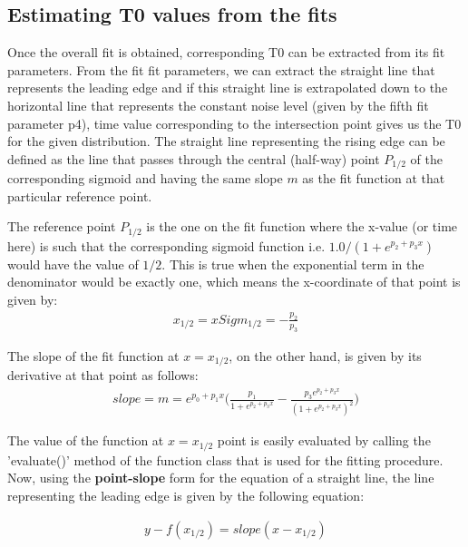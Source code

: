 \documentclass[12pt,epsfig]{article}
\begin{document}
\subsection{Estimating T0 values from the fits}

Once the overall fit is obtained, corresponding T0 can be extracted from its fit parameters. From the fit
fit parameters, we can extract the straight line that represents the leading edge and if this straight line
is extrapolated down to the horizontal line that represents the constant noise level (given by the fifth
fit parameter p4), time value corresponding to the intersection point gives us the T0 for the given
distribution. The straight line representing the rising edge can be defined as the line that passes through the
central (half-way) point $P_{1/2}$ of the corresponding sigmoid and having the same slope $m$ as the
fit function at that particular reference point.

The reference point $P_{1/2}$ is the one on the fit function where the x-value (or time here) is such that the corresponding
sigmoid function i.e. $1.0/(1+e^{p_2 + p_3 x})$ would have the value of $1/2$. This is true when the exponential term in
the denominator would be exactly one, which means the x-coordinate of that point is given by:
\begin{equation}
\label{xSigHalf}
\begin{aligned}
     x_{1/2} = xSigm_{1/2} = - \frac{p_2}{p_3}
\end{aligned}
\end{equation}

The slope of the fit function at $x = x_{1/2}$, on the other hand, is given by its derivative at that point as
follows:
\begin{equation}
\label{slopeSigHalf}
\begin{aligned}
  slope = m  =  e^{p_0 + p_1 x} \Big( \frac{p_1}{1 + e^{p_2 + p_3 x}} -   \frac{p_3 e^{p_2 + p_3 x}}{(1 + e^{p_2 + p_3 x})^2}    \Big)
\end{aligned}
\end{equation}

The value of the function at $x = x_{1/2}$ point is easily evaluated by calling the 'evaluate()' method of the
function class that is used for the fitting procedure. Now, using the \textbf{point-slope} form for the equation of
a straight line, the line representing the leading edge is given by the following equation:

\begin{equation}
\label{eqLeadingEdge}
\begin{aligned}
  y - f(x_{1/2}) = slope (x - x_{1/2})
\end{aligned}
\end{equation}
\end{document}
